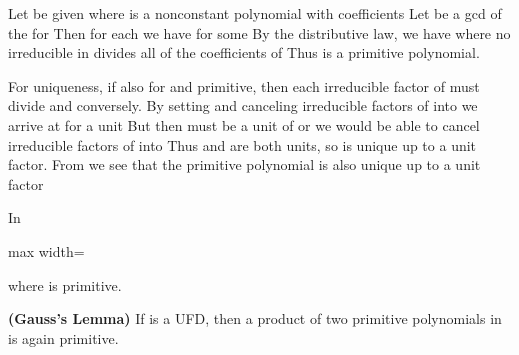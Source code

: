 \documentclass[11pt,oneside]{article}
\begin{document}
\BookNarrativetrue

\begin{BookBody}

 Let  be given where  is a nonconstant polynomial with coefficients  Let  be a gcd of the  for  Then for each  we have  for some  By the distributive law, we have  where no irreducible in  divides all of the coefficients  of  Thus  is a primitive polynomial.

For uniqueness, if also  for  and  primitive, then each irreducible factor of  must divide  and conversely. By setting   and canceling irreducible factors of  into  we arrive at  for a unit  But then  must be a unit of  or we would be able to cancel irreducible factors of  into  Thus  and  are both units, so  is unique up to a unit factor. From   we see that the primitive polynomial  is also unique up to a unit factor\BookEnd{\blacklozenge}

 In 

\begin{center}\begin{adjustbox}{max width=\linewidth}\end{adjustbox}\end{center}

\noindent where  is primitive. \BookEnd{\blacktriangle}

 \textbf{(Gauss’s Lemma)} If  is a UFD, then a product of two primitive polynomials in  is again primitive.


\end{BookBody}
\end{document}
